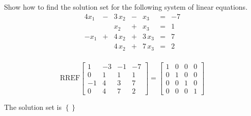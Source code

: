 
\begin{exerciseStatement}


Show how to find the solution set for the following system of linear equations. 
\begin{alignat*}{4} x_{1} &-& 3 \, x_{2} &-& x_{3} &=& -7 \\ & & x_{2} &+& x_{3} &=& 1 \\-x_{1} &+& 4 \, x_{2} &+& 3 \, x_{3} &=& 7 \\ & & 4 \, x_{2} &+& 7 \, x_{3} &=& 2 \\ \end{alignat*}
            


\end{exerciseStatement}
    
\begin{exerciseAnswer} 
\[\mathrm{RREF} \left[\begin{array}{ccc|c}
1 & -3 & -1 & -7 \\
0 & 1 & 1 & 1 \\
-1 & 4 & 3 & 7 \\
0 & 4 & 7 & 2
\end{array}\right]  =  \left[\begin{array}{ccc|c}
1 & 0 & 0 & 0 \\
0 & 1 & 0 & 0 \\
0 & 0 & 1 & 0 \\
0 & 0 & 0 & 1
\end{array}\right] \]

The solution set is \( \left\{\right\} \)


\end{exerciseAnswer}
    
